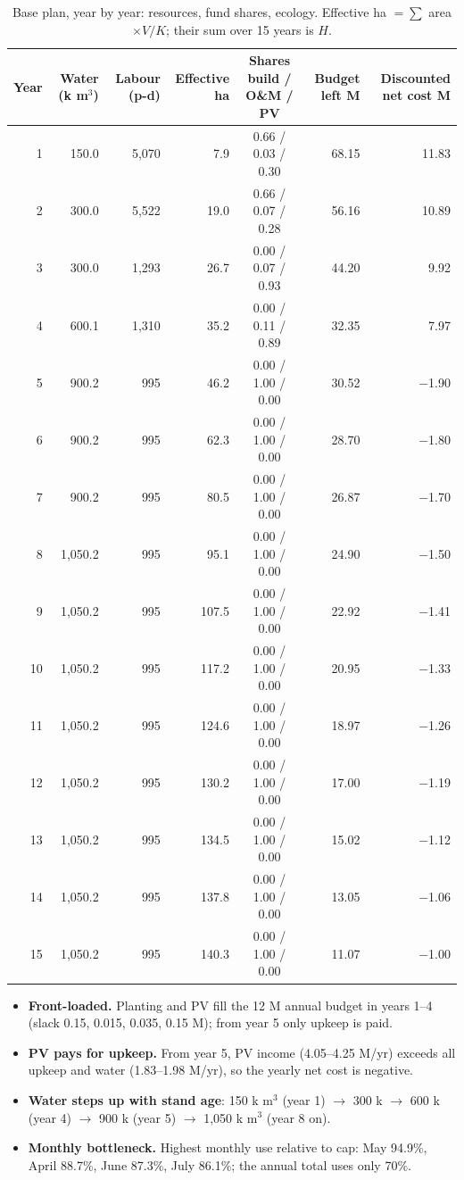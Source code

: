 \documentclass[11pt,a4paper]{article}
\begin{document}
\begin{table}[H]\centering\footnotesize
\begin{tabular}{@{}rrrrcrr@{}}
\toprule
Year & Water (k m$^3$) & Labour (p-d) & Effective ha & Shares build / O\&M / PV & Budget left M & Discounted net cost M\\
\midrule
1 & 150.0 & 5,070 & 7.9 & 0.66 / 0.03 / 0.30 & 68.15 & 11.83\\
2 & 300.0 & 5,522 & 19.0 & 0.66 / 0.07 / 0.28 & 56.16 & 10.89\\
3 & 300.0 & 1,293 & 26.7 & 0.00 / 0.07 / 0.93 & 44.20 & 9.92\\
4 & 600.1 & 1,310 & 35.2 & 0.00 / 0.11 / 0.89 & 32.35 & 7.97\\
5 & 900.2 & 995 & 46.2 & 0.00 / 1.00 / 0.00 & 30.52 & $-$1.90\\
6 & 900.2 & 995 & 62.3 & 0.00 / 1.00 / 0.00 & 28.70 & $-$1.80\\
7 & 900.2 & 995 & 80.5 & 0.00 / 1.00 / 0.00 & 26.87 & $-$1.70\\
8 & 1,050.2 & 995 & 95.1 & 0.00 / 1.00 / 0.00 & 24.90 & $-$1.50\\
9 & 1,050.2 & 995 & 107.5 & 0.00 / 1.00 / 0.00 & 22.92 & $-$1.41\\
10 & 1,050.2 & 995 & 117.2 & 0.00 / 1.00 / 0.00 & 20.95 & $-$1.33\\
11 & 1,050.2 & 995 & 124.6 & 0.00 / 1.00 / 0.00 & 18.97 & $-$1.26\\
12 & 1,050.2 & 995 & 130.2 & 0.00 / 1.00 / 0.00 & 17.00 & $-$1.19\\
13 & 1,050.2 & 995 & 134.5 & 0.00 / 1.00 / 0.00 & 15.02 & $-$1.12\\
14 & 1,050.2 & 995 & 137.8 & 0.00 / 1.00 / 0.00 & 13.05 & $-$1.06\\
15 & 1,050.2 & 995 & 140.3 & 0.00 / 1.00 / 0.00 & 11.07 & $-$1.00\\
\bottomrule
\end{tabular}
\caption{Base plan, year by year: resources, fund shares, ecology. Effective ha $=\sum$ area $\times V/K$; their sum over 15 years is $H$.}
\label{tab:yearB}
\end{table}

\begin{itemize}
\item \textbf{Front-loaded.} Planting and PV fill the 12 M annual budget in years 1--4 (slack 0.15, 0.015, 0.035, 0.15 M); from year 5 only upkeep is paid.
\item \textbf{PV pays for upkeep.} From year 5, PV income (4.05--4.25 M/yr) exceeds all upkeep and water (1.83--1.98 M/yr), so the yearly net cost is negative.
\item \textbf{Water steps up with stand age}: 150 k m$^3$ (year 1) $\to$ 300 k $\to$ 600 k (year 4) $\to$ 900 k (year 5) $\to$ 1,050 k m$^3$ (year 8 on).
\item \textbf{Monthly bottleneck.} Highest monthly use relative to cap: May 94.9\%, April 88.7\%, June 87.3\%, July 86.1\%; the annual total uses only 70\%.
\end{itemize}
\end{document}
